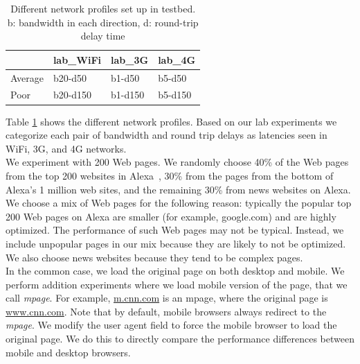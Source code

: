  \begin{table}[!htb]
\centering

\begin{tabular}{|l|l|l|l|}
\hline
\rowcolor[HTML]{656565} 
{\color[HTML]{FFFFFF} {\bf }} & {\color[HTML]{FFFFFF} {\bf lab\_WiFi}} & {\color[HTML]{FFFFFF} {\bf lab\_3G}} & {\color[HTML]{FFFFFF} {\bf lab\_4G}} \\ \hline
Average                               & b20-d50                                  & b1-d50                                  & b5-d50                                  \\ \hline
Poor                                     & b20-d150                                  & b1-d150                                  & b5-d150                               \\ \hline
\end{tabular}
\caption{Different network profiles set up in testbed. b: bandwidth in each direction, d: round-trip delay time}
\label{table:net_profiles}
\end{table}

\noindent Table \ref{table:net_profiles} shows the different network profiles. Based on our lab experiments we categorize each pair of bandwidth and round trip delays as latencies seen in WiFi, 3G, and 4G networks.\\
   
{} We experiment with 200 Web pages. We randomly choose 40\% of the Web pages from the top 200 websites in Alexa~\cite{alexa}, 30\% from the pages from the bottom of Alexa's 1 million web sites, and the remaining 30\% from news websites on Alexa. We choose a mix of Web pages for the following reason: typically the popular top 200 Web pages on Alexa are smaller (for example, google.com) and are highly optimized. The performance of such Web pages may not be typical. Instead, we include unpopular pages in our mix because they are likely to not be  optimized.  We also choose news websites because they tend to be complex pages. \\

\noindent In the common case, we load the original page on both desktop and mobile. We  perform addition experiments where we load mobile version of the page, that we call {\em mpage}. For example,  \url{m.cnn.com} is an mpage, where the original page is \url{www.cnn.com}. Note that by default, mobile browsers always redirect to the {\em mpage}. We modify the user agent field to force the mobile browser to load the original page. We do this  to directly compare the performance differences between  mobile and desktop browsers.\\

